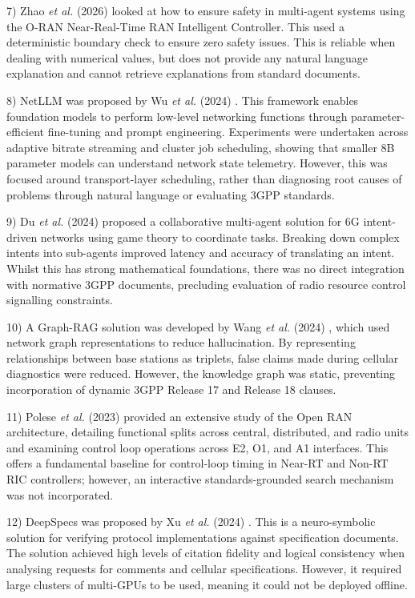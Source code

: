 \documentclass[conference]{IEEEtran}
\begin{document}
7) Zhao \textit{et al.} (2026) \cite{zhao2026} looked at how to ensure safety in multi-agent systems using the O-RAN Near-Real-Time RAN Intelligent Controller. This used a deterministic boundary check to ensure zero safety issues. This is reliable when dealing with numerical values, but does not provide any natural language explanation and cannot retrieve explanations from standard documents.

8) NetLLM was proposed by Wu \textit{et al.} (2024) \cite{wu2024}. This framework enables foundation models to perform low-level networking functions through parameter-efficient fine-tuning and prompt engineering. Experiments were undertaken across adaptive bitrate streaming and cluster job scheduling, showing that smaller 8B parameter models can understand network state telemetry. However, this was focused around transport-layer scheduling, rather than diagnosing root causes of problems through natural language or evaluating 3GPP standards.

9) Du \textit{et al.} (2024) \cite{du2024} proposed a collaborative multi-agent solution for 6G intent-driven networks using game theory to coordinate tasks. Breaking down complex intents into sub-agents improved latency and accuracy of translating an intent. Whilst this has strong mathematical foundations, there was no direct integration with normative 3GPP documents, precluding evaluation of radio resource control signalling constraints.

10) A Graph-RAG solution was developed by Wang \textit{et al.} (2024) \cite{wang2024}, which used network graph representations to reduce hallucination. By representing relationships between base stations as triplets, false claims made during cellular diagnostics were reduced. However, the knowledge graph was static, preventing incorporation of dynamic 3GPP Release 17 and Release 18 clauses.

11) Polese \textit{et al.} (2023) \cite{polese2023} provided an extensive study of the Open RAN architecture, detailing functional splits across central, distributed, and radio units and examining control loop operations across E2, O1, and A1 interfaces. This offers a fundamental baseline for control-loop timing in Near-RT and Non-RT RIC controllers; however, an interactive standards-grounded search mechanism was not incorporated.

12) DeepSpecs was proposed by Xu \textit{et al.} (2024) \cite{xu2024}. This is a neuro-symbolic solution for verifying protocol implementations against specification documents. The solution achieved high levels of citation fidelity and logical consistency when analysing requests for comments and cellular specifications. However, it required large clusters of multi-GPUs to be used, meaning it could not be deployed offline.
\end{document}
